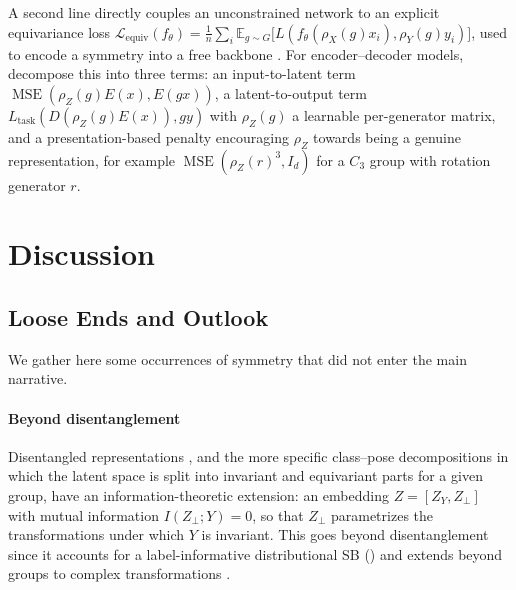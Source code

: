 \documentclass[mathematics,review,submit,moreauthors]{Definitions/mdpi}
\begin{document}
A second line directly couples an unconstrained network to an explicit equivariance loss $\mathcal{L}_{\mathrm{equiv}}(f_\theta)=\frac1n\sum_i\mathbb{E}_{g\sim G}\big[L(f_\theta(\rho_X(g)x_i),\rho_Y(g)y_i)\big]$, used to encode a symmetry into a free backbone \citep{escriche2025,elhag2026}.
For encoder--decoder models, \citet{ali2026} decompose this into three terms: an input-to-latent term $\operatorname{MSE}(\rho_Z(g)E(x),E(gx))$, a latent-to-output term $L_{\mathrm{task}}(D(\rho_Z(g)E(x)),gy)$ with $\rho_Z(g)$ a learnable per-generator matrix, and a presentation-based penalty encouraging $\rho_Z$ towards being a genuine representation, for example $\operatorname{MSE}(\rho_Z(r)^3,I_d)$ for a $C_3$ group with rotation generator $r$.

\section{Discussion}\label{sec:discussion}

\subsection{Loose Ends and Outlook}\label{sec:loose-ends}
We gather here some occurrences of symmetry that did not enter the main narrative.

\paragraph{Beyond disentanglement}
Disentangled representations \citep{higgins2018}, and the more specific class--pose decompositions \citep{winter2022anips,marchetti2023p2icais} in which the latent space is split into invariant and equivariant parts for a given group, have an information-theoretic extension: an embedding $Z=[Z_Y,Z_\perp]$ with mutual information $I(Z_\perp;Y)=0$, so that $Z_\perp$ parametrizes the transformations under which $Y$ is invariant.
This goes beyond disentanglement since it accounts for a label-informative distributional SB () and extends beyond groups to complex transformations \citep{wieser2020anips}.
\end{document}
